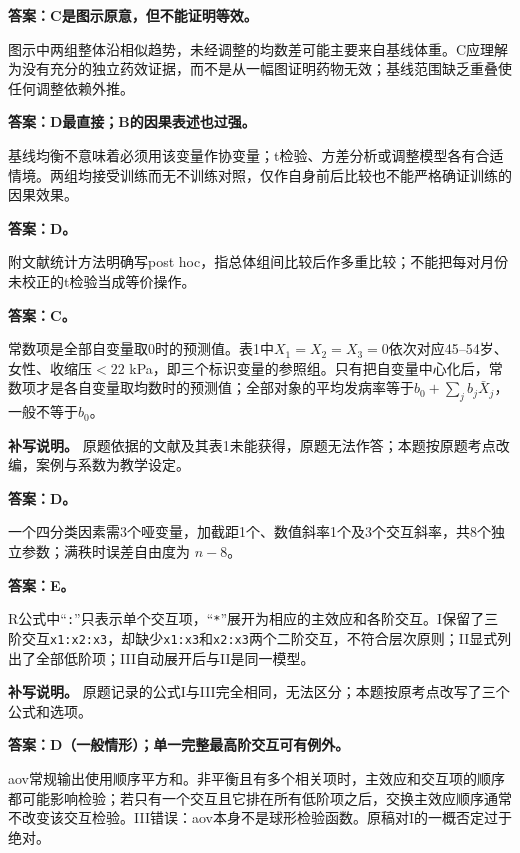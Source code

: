 \textbf{答案：C是图示原意，但不能证明等效。}

图示中两组整体沿相似趋势，未经调整的均数差可能主要来自基线体重。C应理解为没有充分的独立药效证据，而不是从一幅图证明药物无效；基线范围缺乏重叠使任何调整依赖外推。



\textbf{答案：D最直接；B的因果表述也过强。}

基线均衡不意味着必须用该变量作协变量；t检验、方差分析或调整模型各有合适情境。两组均接受训练而无不训练对照，仅作自身前后比较也不能严格确证训练的因果效果。



\textbf{答案：D。}

附文献统计方法明确写post hoc，指总体组间比较后作多重比较；不能把每对月份未校正的t检验当成等价操作。



\textbf{答案：C。}

常数项是全部自变量取0时的预测值。表1中\(X_1=X_2=X_3=0\)依次对应45--54岁、女性、收缩压\(<22\) kPa，即三个标识变量的参照组。只有把自变量中心化后，常数项才是各自变量取均数时的预测值；全部对象的平均发病率等于\(b_0+\sum_jb_j\bar X_j\)，一般不等于\(b_0\)。

\textbf{补写说明。} 原题依据的文献及其表1未能获得，原题无法作答；本题按原题考点改编，案例与系数为教学设定。



\textbf{答案：D。}

一个四分类因素需3个哑变量，加截距1个、数值斜率1个及3个交互斜率，共8个独立参数；满秩时误差自由度为 \(n-8\)。



\textbf{答案：E。}

R公式中``\texttt{:}''只表示单个交互项，``\texttt{*}''展开为相应的主效应和各阶交互。I保留了三阶交互\texttt{x1:x2:x3}，却缺少\texttt{x1:x3}和\texttt{x2:x3}两个二阶交互，不符合层次原则；II显式列出了全部低阶项；III自动展开后与II是同一模型。

\textbf{补写说明。} 原题记录的公式I与III完全相同，无法区分；本题按原考点改写了三个公式和选项。



\textbf{答案：D（一般情形）；单一完整最高阶交互可有例外。}

aov常规输出使用顺序平方和。非平衡且有多个相关项时，主效应和交互项的顺序都可能影响检验；若只有一个交互且它排在所有低阶项之后，交换主效应顺序通常不改变该交互检验。III错误：aov本身不是球形检验函数。原稿对I的一概否定过于绝对。


